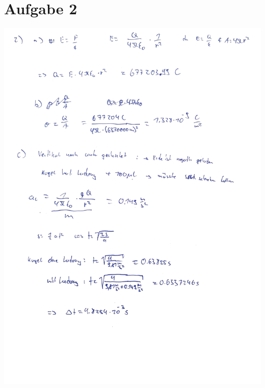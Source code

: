 \documentclass[a4paper]{article}
\begin{document}
\section*{Aufgabe 2}
\includegraphics[width=15cm]{2.jpg}

\newpage
\end{document}

